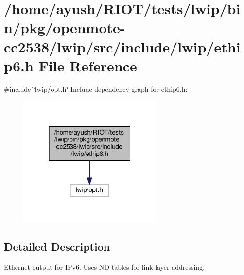 \hypertarget{openmote-cc2538_2lwip_2src_2include_2lwip_2ethip6_8h}{}\section{/home/ayush/\+R\+I\+O\+T/tests/lwip/bin/pkg/openmote-\/cc2538/lwip/src/include/lwip/ethip6.h File Reference}
\label{openmote-cc2538_2lwip_2src_2include_2lwip_2ethip6_8h}
{\ttfamily \#include \char`\"{}lwip/opt.\+h\char`\"{}}\newline
Include dependency graph for ethip6.\+h\+:
\nopagebreak
\begin{figure}[H]
\begin{center}
\leavevmode
\includegraphics[width=205pt]{openmote-cc2538_2lwip_2src_2include_2lwip_2ethip6_8h__incl}
\end{center}
\end{figure}


\subsection{Detailed Description}
Ethernet output for I\+Pv6. Uses ND tables for link-\/layer addressing. 